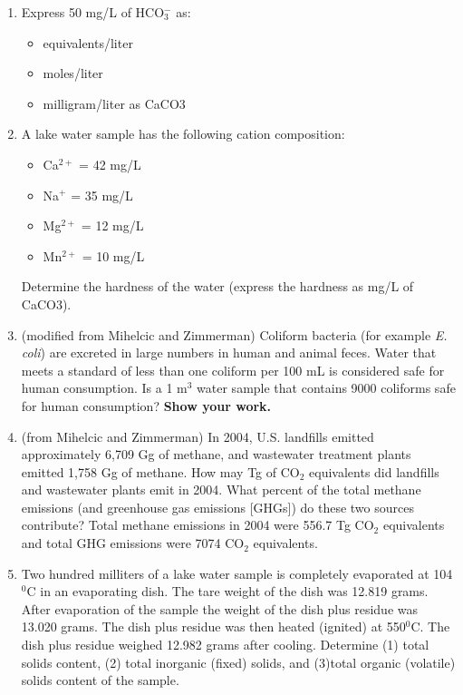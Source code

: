 \documentclass[12pt,letterpaper]{article}
\begin{document}
\begin{enumerate}
\item 	Express 50 mg/L of  HCO$_3^-$ as:
\begin{itemize}
\item equivalents/liter
\item moles/liter
\item 	milligram/liter as CaCO3
\end{itemize}

\item A lake water sample has the following cation composition:
\begin{itemize}
\item Ca$^{2+}$ = 42 mg/L
\item Na$^{+}$ = 35 mg/L
\item Mg$^{2+}$ = 12 mg/L
\item Mn$^{2+}$ = 10 mg/L
\end{itemize}
Determine the hardness of the water (express the hardness as mg/L of CaCO3).
 
\item (modified from Mihelcic and Zimmerman) Coliform bacteria (for example \emph{E. coli}) are excreted in large numbers in human and animal feces.  Water that meets a standard of less than one coliform per 100 mL is considered safe for human consumption.  Is a 1 m$^3$ water sample that contains 9000 coliforms safe for human consumption?  \textbf{Show your work.}


\item (from Mihelcic and Zimmerman) In 2004, U.S. landfills emitted approximately 6,709 Gg of methane, and wastewater treatment plants emitted 1,758 Gg of methane.  How may Tg  of CO$_2$ equivalents did landfills and wastewater plants emit in 2004.  What percent of the total methane emissions (and greenhouse gas emissions [GHGs]) do these two sources contribute? Total methane emissions in 2004 were 556.7 Tg CO$_2$ equivalents and total GHG emissions were 7074 CO$_2$ equivalents. 


\item Two hundred milliters of a lake water sample is completely evaporated at 104$^0$C in an evaporating dish.  The tare weight of the dish was 12.819 grams.  After evaporation of the sample the weight of the dish plus residue was 13.020 grams.  The dish plus residue was then heated (ignited) at 550$^0$C.  The dish plus residue weighed 12.982 grams after cooling.  Determine (1) total solids content, (2) total inorganic (fixed) solids, and (3)total organic (volatile) solids content of the sample. 


\end{enumerate}
\end{document}
